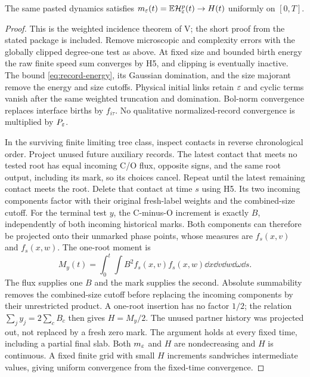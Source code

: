 \begin{lemma}\label{lem:incidence-mean}
The same pasted dynamics satisfies
$m_\varepsilon(t)=\mathbb E\mathcal H_\varepsilon^p(t)\to H(t)$ uniformly on $[0,T]$.
\end{lemma}
\begin{proof}
This is the weighted incidence theorem of V; the short proof from the stated
package is included. Remove microscopic and complexity errors with the
globally clipped degree-one test as above. At fixed size and bounded birth
energy the raw finite speed sum converges by H5, and clipping is eventually
inactive. The bound \eqref{eq:record-energy}, its Gaussian domination, and
the size majorant remove the energy and size cutoffs. Physical initial links
retain $\varepsilon$ and cyclic terms vanish after the same weighted truncation and
domination. Bol-norm convergence replaces interface births by $f_{i\tau}$.
No qualitative normalized-record convergence is multiplied by $P_\varepsilon$.

In the surviving finite limiting tree class, inspect contacts in reverse
chronological order. Project unused future auxiliary records. The latest
contact that meets no tested root has equal incoming C/O flux, opposite
signs, and the same root output, including its mark, so its choices cancel.
Repeat until the latest remaining contact meets the root. Delete that
contact at time $s$ using H5. Its two incoming components factor with their
original fresh-label weights and the combined-size cutoff. For the terminal
test $y$, the C-minus-O increment is exactly $B$, independently of both
incoming historical marks. Both components can therefore be projected onto
their unmarked phase points, whose measures are $f_s(x,v)$ and $f_s(x,w)$.
The one-root moment is
\[
 M_y(t)=\int_0^t\int B^2 f_s(x,v)f_s(x,w)
                         \dd x\dd v\dd w\dd\omega\dd s.
\]
The flux supplies one $B$ and the mark supplies the second. Absolute
summability removes the combined-size cutoff before replacing the incoming
components by their unrestricted product. A one-root insertion has no factor
$1/2$; the relation $\sum_j y_j=2\sum_c B_c$ then gives $H=M_y/2$.
The unused partner history was projected out, not replaced by a fresh zero
mark. The argument holds at every fixed time, including a partial final slab.
Both $m_\varepsilon$ and $H$ are nondecreasing and $H$ is continuous. A fixed finite
grid with small $H$ increments sandwiches intermediate values, giving uniform
convergence from the fixed-time convergence.
\end{proof}

